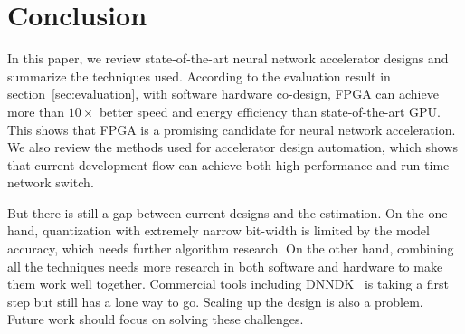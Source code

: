 \section{Conclusion}\label{sec:conclusion}

In this paper, we review state-of-the-art neural network accelerator designs and summarize the techniques used. According to the evaluation result in section~\ref{sec:evaluation}, with software hardware co-design, FPGA can achieve more than $10\times$ better speed and energy efficiency than state-of-the-art GPU. This shows that FPGA is a promising candidate for neural network acceleration. We also review the methods used for accelerator design automation, which shows that current development flow can achieve both high performance and run-time network switch.

But there is still a gap between current designs and the estimation. On the one hand, quantization with extremely narrow bit-width is limited by the model accuracy, which needs further algorithm research. On the other hand, combining all the techniques needs more research in both software and hardware to make them work well together. Commercial tools including DNNDK~\cite{dnndk} is taking a first step but still has a lone way to go. Scaling up the design is also a problem. Future work should focus on solving these challenges. 
